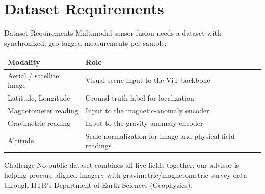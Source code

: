 \documentclass[compress,aspectratio=169]{beamer}
\begin{document}
\section{Dataset Requirements}
\begin{frame}[t]{Dataset Requirements}
\small
Multimodal sensor fusion needs a dataset with synchronized, geo-tagged measurements per sample:
\vspace{0.3em}
\begin{table}
\centering
\begin{tabular}{@{}ll@{}}
\toprule
\textbf{Modality} & \textbf{Role} \\
\midrule
Aerial / satellite image & Visual scene input to the ViT backbone \\
Latitude, Longitude & Ground-truth label for localization \\
Magnetometer reading & Input to the magnetic-anomaly encoder \\
Gravimetric reading & Input to the gravity-anomaly encoder \\
Altitude & Scale normalization for image and physical-field readings \\
\bottomrule
\end{tabular}
\end{table}
\vspace{0.3em}
\begin{block}{Challenge}
No public dataset combines all five fields together; our advisor is helping procure aligned imagery with gravimetric/magnetometric survey data through IITR's Department of Earth Sciences (Geophysics).
\end{block}
\end{frame}

\end{document}
